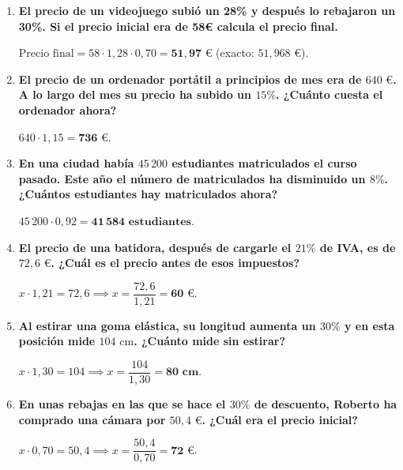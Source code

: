 \documentclass[a4paper,12pt]{article}
\begin{document}
\begin{enumerate}
    \item \textbf{El precio de un videojuego subió un 28\% y después lo rebajaron un 30\%. Si el precio inicial era de 58€ calcula el precio final.}
        \begin{solucion}
            $\text{Precio final} = 58 \cdot 1,28 \cdot 0,70 = \mathbf{51,97\text{ €}}$ (exacto: $51,968\text{ €}$).
        \end{solucion}

    \item \textbf{El precio de un ordenador portátil a principios de mes era de $640\text{ €}$. A lo largo del mes su precio ha subido un $15\%$. ¿Cuánto cuesta el ordenador ahora?}
        \begin{solucion}
            $640 \cdot 1,15 = \mathbf{736\text{ €}}$.
        \end{solucion}

    \item \textbf{En una ciudad había $45\,200$ estudiantes matriculados el curso pasado. Este año el número de matriculados ha disminuido un $8\%$. ¿Cuántos estudiantes hay matriculados ahora?}
        \begin{solucion}
            $45\,200 \cdot 0,92 = \mathbf{41\,584\text{ estudiantes}}$.
        \end{solucion}

    \item \textbf{El precio de una batidora, después de cargarle el $21\%$ de IVA, es de $72{,}6\text{ €}$. ¿Cuál es el precio antes de esos impuestos?}
        \begin{solucion}
            $x \cdot 1,21 = 72,6 \implies x = \dfrac{72,6}{1,21} = \mathbf{60\text{ €}}$.
        \end{solucion}

    \item \textbf{Al estirar una goma elástica, su longitud aumenta un $30\%$ y en esta posición mide $104\text{ cm}$. ¿Cuánto mide sin estirar?}
        \begin{solucion}
            $x \cdot 1,30 = 104 \implies x = \dfrac{104}{1,30} = \mathbf{80\text{ cm}}$.
        \end{solucion}

    \item \textbf{En unas rebajas en las que se hace el $30\%$ de descuento, Roberto ha comprado una cámara por $50{,}4\text{ €}$. ¿Cuál era el precio inicial?}
        \begin{solucion}
            $x \cdot 0,70 = 50,4 \implies x = \dfrac{50,4}{0,70} = \mathbf{72\text{ €}}$.
        \end{solucion}


\end{enumerate}
\end{document}
